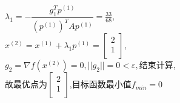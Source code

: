 \begin{solution}
    $\lambda_1=-\dfrac{g_1^Tp^{(1)}}{(p^{(1)})^TAp^{(1)}}=\frac{33}{68}$,\\
    $x^{(2)}=x^{(1)}+\lambda_1p^{(1)}=\begin{bmatrix} 2\\1\\\end{bmatrix}$,\\
    $g_2=\nabla f(x^{(2)})=0,||g_2||=0<\varepsilon,\text{结束计算}$,\\
    故最优点为$\begin{bmatrix} 2\\1\\\end{bmatrix}$,目标函数最小值$f_{min}=0$
\end{solution}

